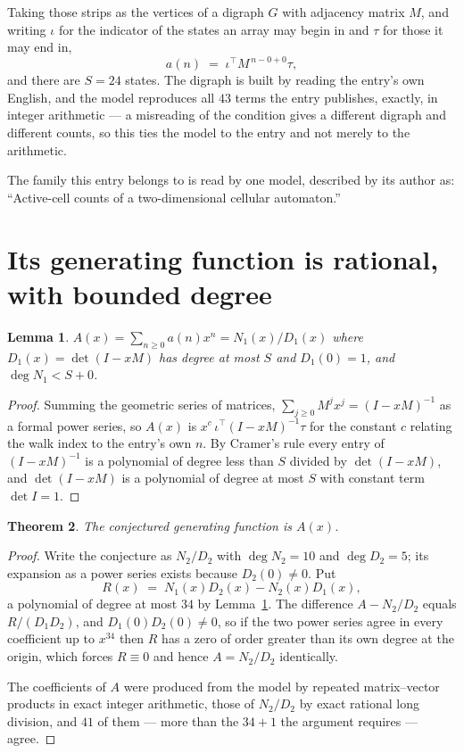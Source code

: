 \documentclass[11pt,a4paper]{article}
\theoremstyle{plain}
\newtheorem{theorem}{Theorem}
\newtheorem{lemma}[theorem]{Lemma}
\theoremstyle{definition}
\begin{document}
Taking those strips as the vertices of a digraph $G$ with adjacency matrix $M$, and writing
$\iota$ for the indicator of the states an array may begin in and $\tau$ for those it may end
in,
\[
a(n)\;=\;\iota^{\!\top}M^{\,n-0+0}\tau ,
\]
and there are $S=24$ states. The digraph is built by reading the entry's own English, and the
model reproduces all $43$ terms the entry publishes, exactly, in integer arithmetic --- a
misreading of the condition gives a different digraph and different counts, so this ties the
model to the entry and not merely to the arithmetic.

The family this entry belongs to is read by one model, described by its author as: ``Active-cell counts of a two-dimensional cellular automaton.''


\section{Its generating function is rational, with bounded degree}

\begin{lemma}\label{lem:rat}
$A(x)=\sum_{n\ge0}a(n)x^n=N_1(x)/D_1(x)$ where $D_1(x)=\det(I-xM)$ has degree at most
$S$ and $D_1(0)=1$, and $\deg N_1<S+0$.
\end{lemma}

\begin{proof}
Summing the geometric series of matrices, $\sum_{j\ge0}M^jx^j=(I-xM)^{-1}$ as a formal
power series, so $A(x)$ is $x^{c}\,\iota^{\!\top}(I-xM)^{-1}\tau$ for the constant $c$
relating the walk index to the entry's own $n$. By Cramer's rule every entry of
$(I-xM)^{-1}$ is a polynomial of degree less than $S$ divided by $\det(I-xM)$, and
$\det(I-xM)$ is a polynomial of degree at most $S$ with constant term $\det I=1$.
\end{proof}

\begin{theorem}
The conjectured generating function is $A(x)$.
\end{theorem}

\begin{proof}
Write the conjecture as $N_2/D_2$ with $\deg N_2=10$ and $\deg D_2=5$; its expansion as a
power series exists because $D_2(0)\neq0$. Put
\[
R(x)\;=\;N_1(x)D_2(x)-N_2(x)D_1(x),
\]
a polynomial of degree at most $34$ by Lemma~\ref{lem:rat}. The difference
$A-N_2/D_2$ equals $R/(D_1D_2)$, and $D_1(0)D_2(0)\neq0$, so if the two power series agree in
every coefficient up to $x^{34}$ then $R$ has a zero of order greater than its own
degree at the origin, which forces $R\equiv0$ and hence $A=N_2/D_2$ identically.

The coefficients of $A$ were produced from the model by repeated matrix--vector products in
exact integer arithmetic, those of $N_2/D_2$ by exact rational long division, and $41$
of them --- more than the $34+1$ the argument requires --- agree.
\end{proof}
\end{document}
